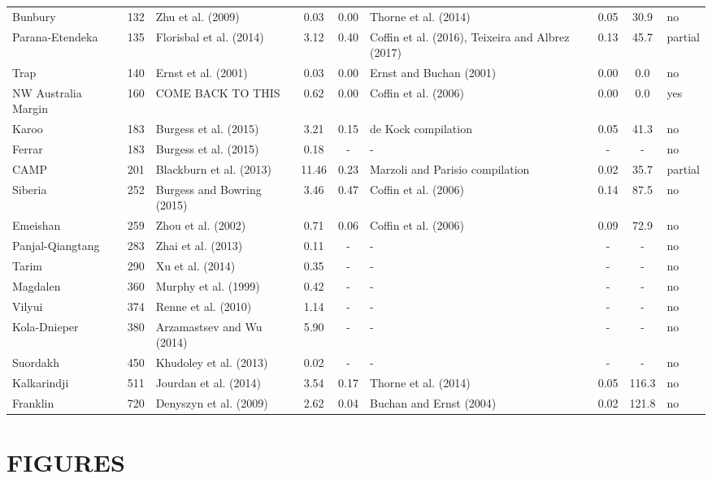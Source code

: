 \documentclass[11pt,letterpaper]{article}
\begin{document}
\begin{table}[h!]
{\begin{tabular}{lc>{\raggedright}p{3.5cm}cc>{\raggedright}p{3.5cm}ccl}
Bunbury & 132 & Zhu et al. (2009) & 0.03 & 0.00 & Thorne et al. (2014) & 0.05 & 30.9 & no \\
Parana-Etendeka & 135 & Florisbal et al. (2014) & 3.12 & 0.40 & Coffin et al. (2016), Teixeira and Albrez (2017) & 0.13 & 45.7 & partial \\
Trap & 140 & Ernst et al. (2001) & 0.03 & 0.00 & Ernst and Buchan (2001) & 0.00 & 0.0 & no \\
NW Australia Margin & 160 & COME BACK TO THIS & 0.62 & 0.00 & Coffin et al. (2006) & 0.00 & 0.0 & yes \\
Karoo & 183 & Burgess et al. (2015) & 3.21 & 0.15 & de Kock compilation & 0.05 & 41.3 & no \\
Ferrar & 183 & Burgess et al. (2015) & 0.18 & - & - & - & - & no \\
CAMP & 201 & Blackburn et al. (2013) & 11.46 & 0.23 & Marzoli and Parisio compilation & 0.02 & 35.7 & partial \\
Siberia & 252 & Burgess and Bowring (2015) & 3.46 & 0.47 & Coffin et al. (2006) & 0.14 & 87.5 & no \\
Emeishan & 259 & Zhou et al. (2002) & 0.71 & 0.06 & Coffin et al. (2006) & 0.09 & 72.9 & no \\
Panjal-Qiangtang & 283 & Zhai et al. (2013) & 0.11 & - & - & - & - & no \\
Tarim & 290 & Xu et al. (2014) & 0.35 & - & - & - & - & no \\
Magdalen & 360 & Murphy et al. (1999) & 0.42 & - & - & - & - & no \\
Vilyui & 374 & Renne et al. (2010) & 1.14 & - & - & - & - & no \\
Kola-Dnieper & 380 & Arzamastsev and Wu (2014) & 5.90 & - & - & - & - & no \\
Suordakh & 450 & Khudoley et al. (2013) & 0.02 & - & - & - & - & no \\
Kalkarindji & 511 & Jourdan et al. (2014) & 3.54 & 0.17 & Thorne et al. (2014) & 0.05 & 116.3 & no \\
Franklin & 720 & Denyszyn et al. (2009) & 2.62 & 0.04 & Buchan and Ernst (2004) & 0.02 & 121.8 & no \\
\bottomrule
\end{tabular}
}
\label{tab:LIPs}
\end{table}

\clearpage
\newpage

\section*{FIGURES}
\end{document}
